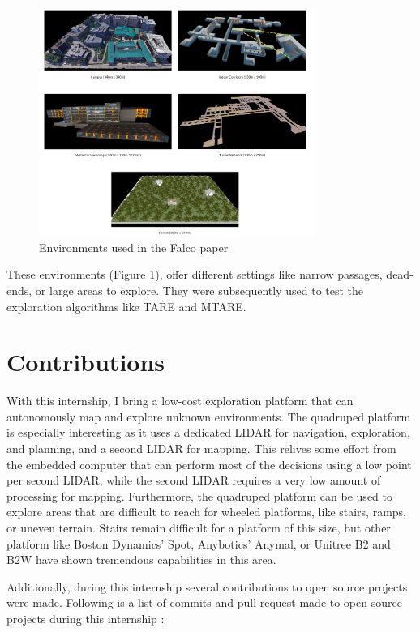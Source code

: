\documentclass[12pt]{article}
\begin{document}
    \begin{figure}[H]
        \centering
        \includegraphics[width=0.8\textwidth]{Images/falco_environments.png}
        \caption{Environments used in the Falco paper}
        \label{fig:falco_environments}
    \end{figure}
    
    These environments (Figure \ref{fig:falco_environments}), offer different settings like narrow passages, dead-ends, or large areas to explore. They were subsequently used to test the exploration algorithms like TARE and MTARE.

\section{Contributions}

    With this internship, I bring a low-cost exploration platform that can autonomously map and explore unknown environments. The quadruped platform is especially interesting as it uses a dedicated LIDAR for navigation, exploration, and planning, and a second LIDAR for mapping. This relives some effort from the embedded computer that can perform most of the decisions using a low point per second LIDAR, while the second LIDAR requires a very low amount of processing for mapping. Furthermore, the quadruped platform can be used to explore areas that are difficult to reach for wheeled platforms, like stairs, ramps, or uneven terrain. Stairs remain difficult for a platform of this size, but other platform like Boston Dynamics' Spot, Anybotics' Anymal, or Unitree B2 and B2W have shown tremendous capabilities in this area.

    Additionally, during this internship several contributions to open source projects were made. Following is a list of commits and pull request made to open source projects during this internship :
\end{document}
